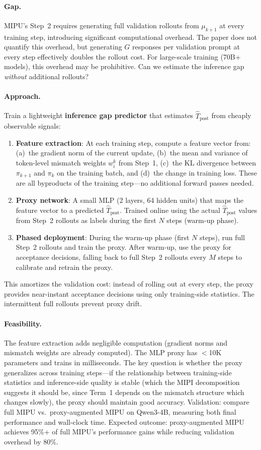 \documentclass[11pt,a4paper]{article}
\begin{document}
\paragraph{Gap.} MIPU's Step~2 requires generating full validation rollouts from $\mu_{k+1}$ at every training step, introducing significant computational overhead. The paper does not quantify this overhead, but generating $G$ responses per validation prompt at every step effectively doubles the rollout cost. For large-scale training (70B+ models), this overhead may be prohibitive. Can we estimate the inference gap \emph{without} additional rollouts?

\paragraph{Approach.} Train a lightweight \textbf{inference gap predictor} that estimates $\hat{T}_{\mathrm{post}}$ from cheaply observable signals:
\begin{enumerate}
\item \textbf{Feature extraction}: At each training step, compute a feature vector from: (a)~the gradient norm of the current update, (b)~the mean and variance of token-level mismatch weights $w_i^k$ from Step~1, (c)~the KL divergence between $\pi_{k+1}$ and $\pi_k$ on the training batch, and (d)~the change in training loss. These are all byproducts of the training step---no additional forward passes needed.
\item \textbf{Proxy network}: A small MLP (2 layers, 64 hidden units) that maps the feature vector to a predicted $\hat{T}_{\mathrm{post}}$. Trained online using the actual $\hat{T}_{\mathrm{post}}$ values from Step~2 rollouts as labels during the first $N$ steps (warm-up phase).
\item \textbf{Phased deployment}: During the warm-up phase (first $N$ steps), run full Step~2 rollouts and train the proxy. After warm-up, use the proxy for acceptance decisions, falling back to full Step~2 rollouts every $M$ steps to calibrate and retrain the proxy.
\end{enumerate}
This amortizes the validation cost: instead of rolling out at every step, the proxy provides near-instant acceptance decisions using only training-side statistics. The intermittent full rollouts prevent proxy drift.

\paragraph{Feasibility.} The feature extraction adds negligible computation (gradient norms and mismatch weights are already computed). The MLP proxy has $<$10K parameters and trains in milliseconds. The key question is whether the proxy generalizes across training steps---if the relationship between training-side statistics and inference-side quality is stable (which the MIPI decomposition suggests it should be, since Term~1 depends on the mismatch structure which changes slowly), the proxy should maintain good accuracy. Validation: compare full MIPU vs.\ proxy-augmented MIPU on Qwen3-4B, measuring both final performance and wall-clock time. Expected outcome: proxy-augmented MIPU achieves 95\%+ of full MIPU's performance gains while reducing validation overhead by 80\%.
\end{document}
